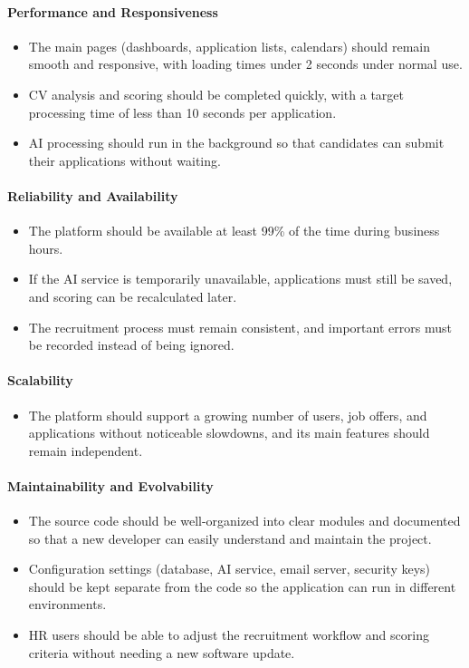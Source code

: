 \paragraph*{Performance and Responsiveness}
\begin{itemize}[label={-}]
    \item The main pages (dashboards, application lists, calendars) should remain smooth and responsive, with loading times under 2 seconds under normal use.
    \item CV analysis and scoring should be completed quickly, with a target processing time of less than 10 seconds per application.
    \item AI processing should run in the background so that candidates can submit their applications without waiting.
\end{itemize}

\paragraph*{Reliability and Availability}
\begin{itemize}[label={-}]
    \item The platform should be available at least 99\% of the time during business hours.
    \item If the AI service is temporarily unavailable, applications must still be saved, and scoring can be recalculated later.
    \item The recruitment process must remain consistent, and important errors must be recorded instead of being ignored.
\end{itemize}

\paragraph*{Scalability}
\begin{itemize}[label={-}]
    \item The platform should support a growing number of users, job offers, and applications without noticeable slowdowns, and its main features should remain independent.
\end{itemize}

\paragraph*{Maintainability and Evolvability}
\begin{itemize}[label={-}]
    \item The source code should be well-organized into clear modules and documented so that a new developer can easily understand and maintain the project.
    \item Configuration settings (database, AI service, email server, security keys) should be kept separate from the code so the application can run in different environments.
    \item HR users should be able to adjust the recruitment workflow and scoring criteria without needing a new software update.
\end{itemize}


